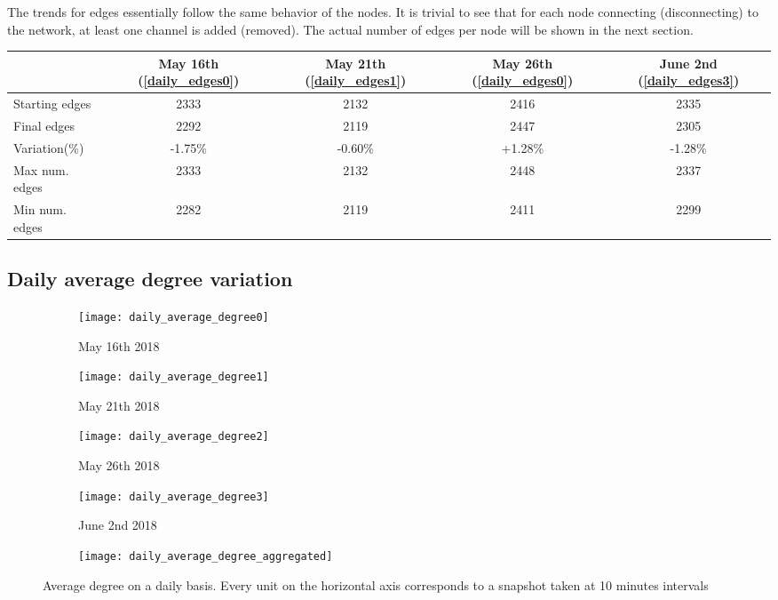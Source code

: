 	The trends for edges essentially follow the same behavior of the nodes. It is trivial to see that for each node connecting (disconnecting) to the network, at least one channel is added (removed). The actual number of edges per node will be shown in the next section.
	
	\begin{center}
	\begin{tabulary}{\linewidth}{| L | C | C | C | C |}
		\hline
		& May 16th (\ref{daily_edges0}) & May 21th (\ref{daily_edges1}) & May 26th (\ref{daily_edges0}) & June 2nd (\ref{daily_edges3}) \\
		\hline
		Starting edges & 2333 & 2132 & 2416 & 2335 \\ \hline
		Final edges & 2292 & 2119 & 2447 & 2305 \\ \hline
		Variation(\%) & -1.75\% & -0.60\% & +1.28\% & -1.28\% \\ \hline
		Max num. edges & 2333 & 2132 & 2448 & 2337 \\ \hline
		Min num. edges & 2282 & 2119 & 2411 & 2299 \\ \hline	
	\end{tabulary}
	\end{center}

	\subsection{Daily average degree variation}

	\begin{figure}[htbp!]
	\centering
		\begin{subfigure}{0.49\textwidth}
			\centering
			\texttt{[image: daily\_average\_degree0]}
			\caption{May 16th 2018}
			\label{daily_degree0}
		\end{subfigure}
		\begin{subfigure}{0.49\textwidth}
			\centering
			\texttt{[image: daily\_average\_degree1]}
			\caption{May 21th 2018}
			\label{daily_degree1}
		\end{subfigure}
		\begin{subfigure}{0.49\textwidth}
			\centering
			\texttt{[image: daily\_average\_degree2]}
			\caption{May 26th 2018}
			\label{daily_degree2}
		\end{subfigure}
		\begin{subfigure}{0.49\textwidth}
			\centering
			\texttt{[image: daily\_average\_degree3]}
			\caption{June 2nd 2018}
			\label{daily_degree3}
		\end{subfigure}
		\begin{subfigure}{\textwidth}
			\centering
			\texttt{[image: daily\_average\_degree\_aggregated]}
			\caption{}
		\end{subfigure}
	\caption{Average degree on a daily basis. Every unit on the horizontal axis corresponds to a snapshot taken at 10 minutes intervals}
	\label{daily_degree _variation}
	\end{figure}

